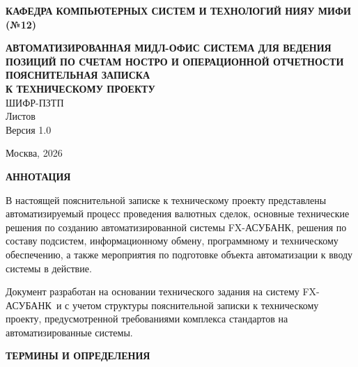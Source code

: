 \documentclass[a4paper,14pt]{extarticle}
\newcommand{\OrgName}{Кафедра компьютерных систем и технологий НИЯУ МИФИ (№12)}
\newcommand{\SystemFullName}{Автоматизированная мидл-офис система для ведения позиций по счетам ностро и операционной отчетности}
\newcommand{\SystemShortName}{FX-АСУБАНК}
\newcommand{\DocCipher}{ШИФР-ПЗТП}
\newcommand{\DocVersion}{1.0}
\newcommand{\DocYear}{2026}
\begin{document}
\sloppy

\thispagestyle{empty}
\begin{center}
\textbf{\MakeUppercase{\OrgName}}
\end{center}

\vspace{28mm}

\begin{center}
\textbf{\MakeUppercase{\SystemFullName}}\\[6mm]
\textbf{\MakeUppercase{ПОЯСНИТЕЛЬНАЯ ЗАПИСКА\\К ТЕХНИЧЕСКОМУ ПРОЕКТУ}}\\[4mm]
\DocCipher\\[4mm]
Листов \pageref{LastPage}\\[4mm]
Версия \DocVersion
\end{center}

\vfill

\begin{center}
Москва, \DocYear
\end{center}

\newpage

\begin{center}
\textbf{\MakeUppercase{АННОТАЦИЯ}}
\end{center}

В настоящей пояснительной записке к техническому проекту представлены автоматизируемый процесс проведения валютных сделок, основные технические решения по созданию автоматизированной системы \SystemShortName, решения по составу подсистем, информационному обмену, программному и техническому обеспечению, а также мероприятия по подготовке объекта автоматизации к вводу системы в действие.

Документ разработан на основании технического задания на систему \SystemShortName\ и с учетом структуры пояснительной записки к техническому проекту, предусмотренной требованиями комплекса стандартов на автоматизированные системы.

\newpage

\tableofcontents
\newpage

\begin{center}
\textbf{\MakeUppercase{ТЕРМИНЫ И ОПРЕДЕЛЕНИЯ}}
\end{center}
\end{document}
